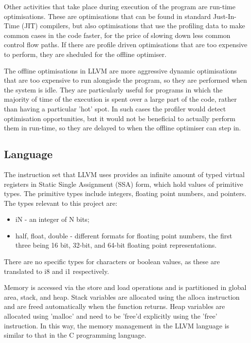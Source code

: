\documentclass[parskip]{cs4rep}
\begin{document}
Other activities that take place during execution of the program are run-time optimisations. These are optimisations that can be found in standard Just-In-Time (JIT) compilers, but also optimisations that use the profiling data to make common cases in the code faster, for the price of slowing down less common control flow paths. If there are profile driven optimisations that are too expensive to perform, they are sheduled for the offline optimiser.

The offline optimisations in LLVM are more aggressive dynamic optimisations that are too expensive to run alongisde the program, so they are performed when the system is idle. They are particularly useful for programs in which the majority of time of the execution is spent over a large part of the code, rather than having a particular 'hot' spot. In such cases the profiler would detect optimisation opportunities, but it would not be beneficial to actually perform them in run-time, so they are delayed to when the offline optimiser can step in.

\subsection{Language} \label{sec:LLVMLanguage}

The instruction set that LLVM uses provides an infinite amount of typed virtual registers in Static Single Assignment (SSA) form, which hold values of primitive types. The primitive types include integers, floating point numbers, and pointers. The types relevant to this project are:
\begin{itemize}
\item iN - an integer of N bits;
\item half, float, double - different formats for floating point numbers, the first three being 16 bit, 32-bit, and 64-bit floating point representations.
\end{itemize}

There are no specific types for characters or boolean values, as these are translated to i8 and i1 respectively.

Memory is accessed via the store and load operations and is partitioned in global area, stack, and heap. Stack variables are allocated using the alloca instruction and are freed automatically when the function returns. Heap variables are allocated using 'malloc' and need to be 'free'd explicitly using the 'free' instruction. In this way, the memory management in the LLVM language is similar to that in the C programming language.
\end{document}

